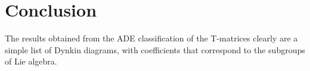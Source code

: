 \documentclass{article}
\begin{document}
\section{Conclusion}

The results obtained from the ADE classification of the T-matrices clearly are
a simple list of Dynkin diagrams, with coefficients that correspond to the
subgroups of Lie algebra.
\end{document}

